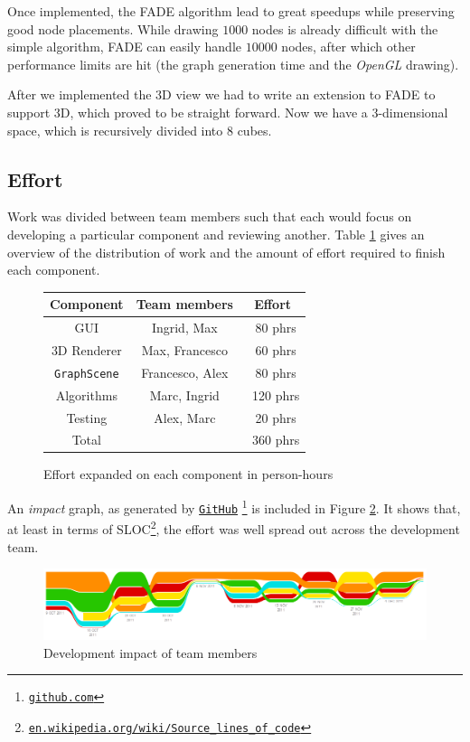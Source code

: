 \documentclass[a4paper,11pt,titlepage]{article}
\let\stdhref\href
\renewcommand{\href}[2]{\stdhref{#1}{\texttt{#2}}}
\newcommand{\code}[1]{\texttt{#1}}
\newcommand{\buzz}[1]{\emph{#1}}
\newcommand{\myhref}[1]{\href{http://#1}{#1}}
\newcommand{\OpenGL}{\buzz{OpenGL} }
\newcommand{\GitHub}{\href{https://github.com}{GitHub} }
\begin{document}
Once implemented, the FADE algorithm lead to great speedups while
preserving good node placements. While drawing \(1000\) nodes is
already difficult with the simple algorithm, FADE can easily handle
\(10000\) nodes, after which other performance limits are hit (the
graph generation time and the \OpenGL drawing).

After we implemented the 3D view we had to write an extension to FADE to support
3D, which proved to be straight forward. Now we have a 3-dimensional space,
which is recursively divided into $8$ cubes.

\subsection{Effort}

Work was divided between team members such that each would focus on
developing a particular component and reviewing another. Table
\ref{fig:effort} gives an overview of the distribution of work and the
amount of effort required to finish each component.

\begin{figure}[ht!]
  \centering
  \begin{tabular}{c|c|c}
    Component         & Team members    & Effort \\
    \hline
    GUI               & Ingrid, Max     & ~80 phrs \\
    3D Renderer       & Max, Francesco  & ~60 phrs\\
    \code{GraphScene} & Francesco, Alex & ~80 phrs\\
    Algorithms        & Marc, Ingrid    & ~120 phrs\\
    Testing           & Alex, Marc      & ~20 phrs\\
    \hline
    Total             &                 & ~360 phrs
  \end{tabular}
  \caption{Effort expanded on each component in person-hours}
  \label{fig:effort}
\end{figure}

An \emph{impact} graph, as generated by
\GitHub\footnote{\href{https://github.com}{github.com}} is included in Figure
\ref{fig:impact}. It shows that, at least in terms of
SLOC\footnote{\myhref{en.wikipedia.org/wiki/Source\_lines\_of\_code}},
the effort was well spread out across the development team.

\begin{figure}[ht!]
  \centering
  \includegraphics[width=\textwidth]{impact.png}
  \caption{Development impact of team members}
  \label{fig:impact}
\end{figure}
\end{document}

